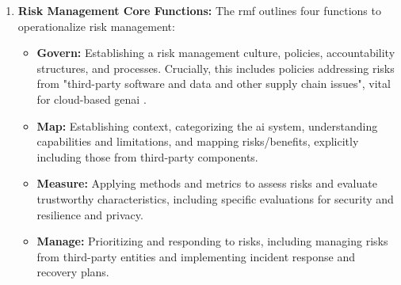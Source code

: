\begin{enumerate}
\item \textbf{Risk Management Core Functions:} The \gls{rmf} outlines four functions to operationalize risk management:
\begin{itemize}
  \item \textbf{Govern:} Establishing a risk management culture, policies, accountability structures, and processes. Crucially, this includes policies addressing risks from "third-party software and data and other supply chain issues", vital for cloud-based \gls{genai} \cite[pp.21-24]{tabassi_artificial_2023}.
    \item \textbf{Map:} Establishing context, categorizing the \gls{ai} system, understanding capabilities and limitations, and mapping risks/benefits, explicitly including those from third-party components\cite{tabassi_artificial_2023}.
    \item \textbf{Measure:} Applying methods and metrics to assess risks and evaluate trustworthy characteristics, including specific evaluations for security and resilience and privacy\cite{tabassi_artificial_2023}.
    \item \textbf{Manage:} Prioritizing and responding to risks, including managing risks from third-party entities and implementing incident response and recovery plans\cite{tabassi_artificial_2023}.
\end{itemize}
\end{enumerate}

